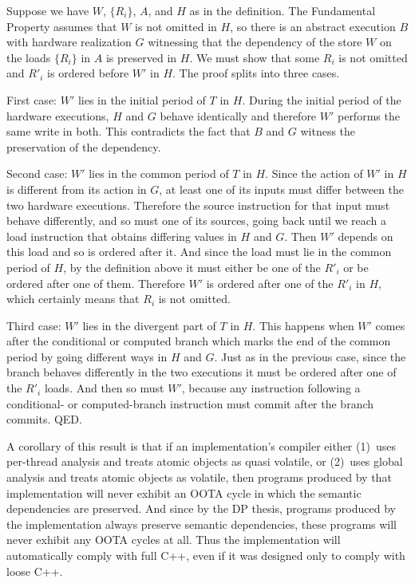Suppose we have $W$, $\{R_i\}$, $A$, and $H$ as in the definition.
The Fundamental Property assumes that $W$ is not omitted in $H$, so
there is an abstract execution $B$ with hardware realization $G$
witnessing that the dependency of the store $W$ on the loads
$\{R_i\}$ in $A$ is preserved in $H$.
We must show that some $R_i$ is not omitted and $R'_i$ is ordered
before $W'$ in $H$.
The proof splits into three cases.

First case: $W'$ lies in the initial period of $T$ in $H$.
During the initial period of the hardware executions, $H$ and $G$
behave identically and therefore $W'$ performs the same write in
both.
This contradicts the fact that $B$ and $G$ witness the preservation
of the dependency.

Second case: $W'$ lies in the common period of $T$ in $H$.
Since the action of $W'$ in $H$ is different from its action in $G$,
at least one of its inputs must differ between the two hardware
executions.
Therefore the source instruction for that input must behave
differently, and so must one of its sources, going back until we reach
a load instruction that obtains differing values in $H$ and $G$.
Then $W'$ depends on this load and so is ordered after it.
And since the load must lie in the common period of $H$, by the
definition above it must either be one of the
$R'_i$ or be ordered after one of them.
Therefore $W'$ is ordered after one of the $R'_i$ in $H$,
which certainly means that $R_i$ is not omitted.

Third case: $W'$ lies in the divergent part of $T$ in $H$.
This happens when $W'$ comes after the conditional or computed branch
which marks the end of the common period by going different ways in
$H$ and $G$.
Just as in the previous case, since the branch behaves differently in
the two executions it must be ordered after one of the $R'_i$ loads.
And then so must $W'$, because any instruction following a conditional-
or computed-branch instruction must commit after the branch commits.
QED.

\medskip

A corollary of this result is that if an implementation's compiler
either
(1)~uses per-thread analysis and treats atomic objects as quasi
volatile, or
(2)~uses global analysis and treats atomic objects as volatile,
then programs produced by that implementation will never exhibit
an OOTA cycle in which the semantic dependencies are preserved.
And since by the DP thesis, programs produced by
the implementation always preserve semantic dependencies,
these programs will never exhibit any OOTA cycles at all.
Thus the implementation will automatically comply with full C++, even
if it was designed only to comply with loose C++.

